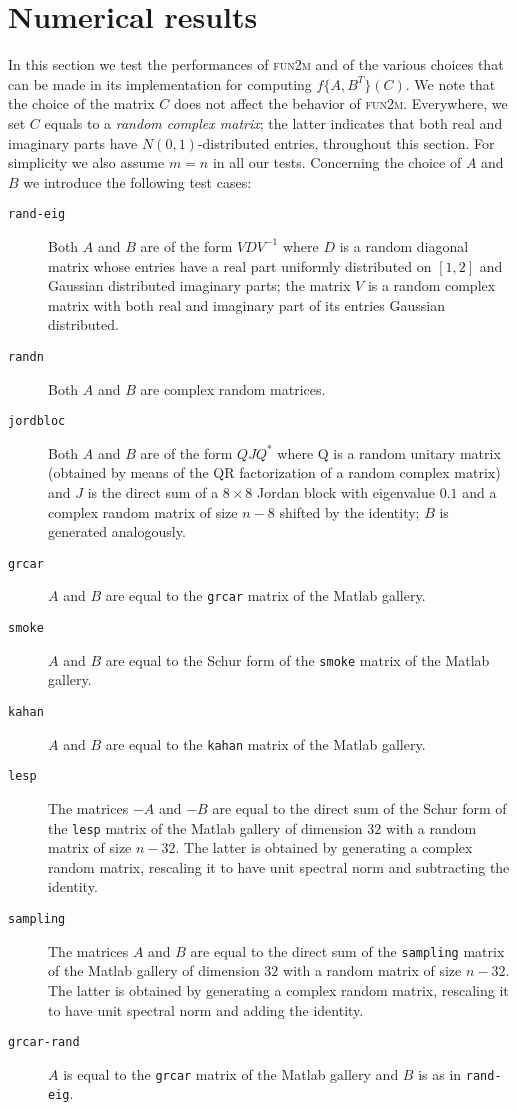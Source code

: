 \documentclass{siamart1116}
\begin{document}
\section{Numerical results}\label{sec:numerical}
In this section we test the performances of \textsc{fun2m} and of the various choices that can be made in its implementation for computing $f\{A,B^T\}(C)$. We note that the choice of the matrix $C$ does not affect the behavior of \textsc{fun2m}. Everywhere, we set $C$ equals to a \emph{random  complex matrix}; the latter indicates that both real and imaginary parts have $N(0,1)$-distributed entries, throughout this section. For simplicity we also assume $m=n$ in all our tests. Concerning the choice of $A$ and $B$ we introduce the following test cases: 
\begin{description}
\item[\texttt{rand-eig}] Both $A$ and $B$ are of the form $VDV^{-1}$ where $D$ is a random diagonal matrix  whose entries have a real part uniformly distributed on $[1,2]$ and Gaussian distributed imaginary parts; the matrix $V$ is a random complex matrix with both real and imaginary part of its entries Gaussian distributed.
    \item[\texttt{randn}]  Both $A$ and $B$ are complex random matrices.    
  \item[\texttt{jordbloc}]   Both $A$ and $B$ are of the form $QJQ^*$ where Q is a random unitary matrix (obtained by means of the QR factorization of a random complex matrix) and $J$ is the 
  direct sum of a $8\times 8$ Jordan block with eigenvalue $0.1$ and a complex random matrix of size $n-8$ shifted by the identity; $B$ is generated analogously.
 \item[\texttt{grcar}] $A$ and $B$ are equal to the \texttt{grcar} matrix of the Matlab gallery.
\item[\texttt{smoke}] $A$ and $B$ are equal to the Schur form of the \texttt{smoke} matrix of the Matlab gallery.
  \item[\texttt{kahan}] $A$ and $B$ are equal to the \texttt{kahan} matrix of the Matlab gallery.
  \item[\texttt{lesp}] The matrices $-A$ and $-B$ are equal to the direct sum of the Schur form of the \texttt{lesp} matrix of the Matlab gallery of dimension $32$ with a random matrix of size $n-32$. The latter is obtained by generating a complex random matrix, rescaling it to have unit spectral norm and subtracting  the identity.
  \item[\texttt{sampling}] The matrices $A$ and $B$ are equal to the direct sum of the \texttt{sampling} matrix of the Matlab gallery of dimension $32$ with a random matrix of size $n-32$. The latter is obtained by generating a complex random matrix, rescaling it to have unit spectral norm and adding  the identity.
  \item[\texttt{grcar-rand}] $A$ is equal to the \texttt{grcar} matrix of the Matlab gallery and $B$ is as in \texttt{rand-eig}. 
\end{description}
\end{document}
